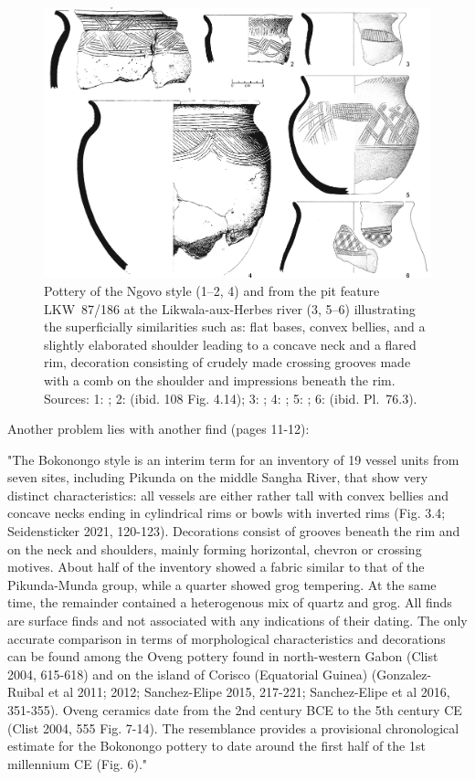 \begin{reviewer}
\begin{figure}[!tb]
	\includegraphics[width=\textwidth]{fig/Ngovo-Typen.jpg}
	\caption{Pottery of the Ngovo style (1--2, 4) and from the pit feature LKW~87/186 at the Likwala-aux-Herbes river (3, 5--6) illustrating the superficially similarities such as: flat bases, convex bellies, and a slightly elaborated shoulder leading to a concave neck and a flared rim, decoration consisting of crudely made crossing grooves made with a comb on the shoulder and impressions beneath the rim. Sources: 1: \citet[108 Fig.~4.7]{deMaret.1986}; 2: (ibid. 108 Fig. 4.14); 3: \citet[Pl.~76.2]{Seidensticker.2021e}; 4: \citet[111 Fig.~5.3]{deMaret.1986}; 5: \citet[Pl.~76.1]{Seidensticker.2021e} ; 6: (ibid. Pl.~76.3).}
	\label{fig:lkw186_ngovo}
\end{figure}

\point Another problem lies with another find (pages 11-12):

"The Bokonongo style is an interim term for an inventory of 19 vessel units from seven sites, including Pikunda on the middle Sangha River, that show very distinct characteristics: all vessels are either rather tall with convex bellies and concave necks ending in cylindrical rims or bowls with inverted rims (Fig. 3.4; Seidensticker 2021, 120-123). Decorations consist of grooves beneath the rim and on the neck and shoulders, mainly forming horizontal, chevron or crossing motives. About half of the inventory showed a fabric similar to that of the Pikunda-Munda group, while a quarter showed grog tempering. At the same time, the remainder contained a heterogenous mix of quartz and grog. All finds are surface finds and not associated with any indications of their dating. The only accurate comparison in terms of morphological characteristics and decorations can be found among the Oveng pottery found in north-western Gabon (Clist 2004, 615-618) and on the island of Corisco (Equatorial Guinea) (Gonzalez-Ruibal et al 2011; 2012; Sanchez-Elipe 2015, 217-221; Sanchez-Elipe et al 2016, 351-355). Oveng ceramics date from the 2nd century BCE to the 5th century CE (Clist 2004, 555 Fig. 7-14). The resemblance provides a provisional chronological estimate for the Bokonongo pottery to date around the first half of the 1st millennium CE (Fig. 6)."


\end{reviewer}
